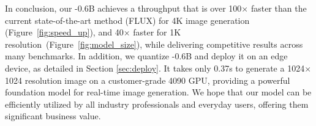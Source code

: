 In conclusion, our \model{}-0.6B achieves a throughput that is over 100$\times$ faster than the current state-of-the-art method (FLUX) for 4K image generation (Figure~\ref{fig:speed_up}), and 40$\times$ faster for 1K resolution~(Figure~\ref{fig:model_size}), while delivering competitive results across many benchmarks.
In addition, we quantize \model{}-0.6B and deploy it on an edge device, as detailed in Section \ref{sec:deploy}. It takes only 0.37s to generate a 1024$\times$1024 resolution image on a customer-grade 4090 GPU, providing a powerful foundation model for real-time image generation.
We hope that our model can be efficiently utilized by all industry professionals and everyday users, offering them significant business value.
